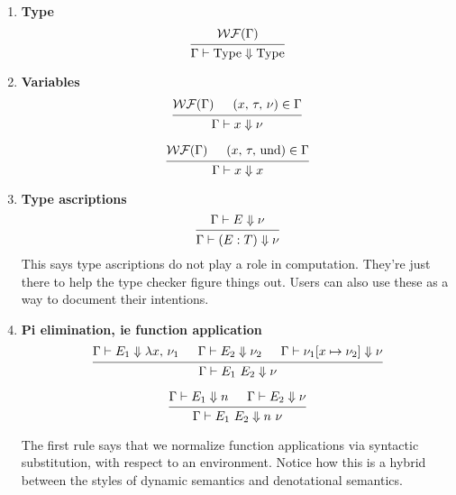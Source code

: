 \documentclass{article}
\begin{document}
\begin{enumerate}
\item \textbf{Type}
  \[
    \begin{prooftree}
      \hypo{\wf(\Gamma)}
      \infer1{\Gamma \vdash \Type \Downarrow \Type} 
    \end{prooftree}
  \]
\item \textbf{Variables} \\
  \[
    \begin{prooftree}
      \hypo{\wf(\Gamma)}
      \hypo{(x, \, \tau, \, \nu) \in \Gamma}
      \infer2{\Gamma \vdash x \Downarrow \nu}
    \end{prooftree} 
  \]

  \[
    \begin{prooftree}
      \hypo{\wf(\Gamma)}
      \hypo{(x, \, \tau, \, \text{und}) \in \Gamma}
      \infer2{\Gamma \vdash x \Downarrow x}
    \end{prooftree} 
  \]

\item \textbf{Type ascriptions} \\
  \[
    \begin{prooftree}
      \hypo{\Gamma \vdash E \Downarrow \nu}
      \infer1{\Gamma \vdash (E : T) \Downarrow \nu}
    \end{prooftree}
  \]
  This says type ascriptions do not play a role in computation. They're just
  there to help the type checker figure things out. Users can also use these as
  a way to document their intentions.
 
\item \textbf{Pi elimination, ie function application} \\
  \[
    \begin{prooftree}
      \hypo{\Gamma \vdash E_1 \Downarrow \lambda x, \, \nu_1}
      \hypo{\Gamma \vdash E_2 \Downarrow \nu_2}
      \hypo{\Gamma \vdash \nu_1[x \mapsto \nu_2] \Downarrow \nu}
      \infer3{\Gamma \vdash E_1 \,\, E_2 \Downarrow \nu}
    \end{prooftree}
  \]

  \[
    \begin{prooftree}
      \hypo{\Gamma \vdash E_1 \Downarrow n}
      \hypo{\Gamma \vdash E_2 \Downarrow \nu}
      \infer2{\Gamma \vdash E_1 \,\, E_2 \Downarrow n \,\, \nu}
    \end{prooftree}
  \]

  The first rule says that we normalize function applications via syntactic
  substitution, with respect to an environment. Notice how this is a hybrid
  between the styles of dynamic semantics and denotational semantics. 


\end{enumerate}
\end{document}
